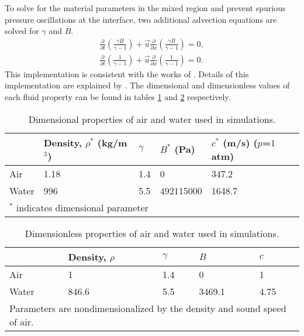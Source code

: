To solve for
the material parameters in the mixed region and prevent spurious
pressure oscillations at the interface, two additional advection
equations are solved for $\gamma$ and $B$.
\begin{subequations} \label{usbe_lung_eosvar_advection}%
\begin{align}%
\frac{\partial}{\partial t}\left(\frac{\gamma B}{\gamma-1}\right)+\vec{u}\frac{\partial}{\partial x}\left(\frac{\gamma B}{\gamma-1}\right) = 0,\\
\frac{\partial}{\partial t}\left(\frac{1}{\gamma-1}\right)+\vec{u}\frac{\partial}{\partial x}\left(\frac{1}{\gamma-1}\right) = 0. 
\end{align}%
\end{subequations}%
This implementation is consistent with the works of \cite{Abgrall1996,
  Shyue2001, Beig2015}. Details of this implementation are explained
by \cite{HenrydeFrahan2015}.
%
The dimensional and dimensionless values of each fluid property can be
found in tables \ref{tab:usbe_lung_dimensional_parameters} and
\ref{tab:usbe_lung_dimensionless_parameters} respectively.
% 
\begin{table}[bp]%
  \begin{center}
    \caption{Dimensional properties of air and water used in simulations.}
    \label{tab:usbe_lung_dimensional_parameters}%
    \begin{tabularx}{0.75\textwidth}{| X | X | X | X | X |}
      \hline
      & Density, $\rho^*$ (kg/m$^3$) & $\gamma$ & $B^*$ (Pa)  & $c^*$ (m/s) ($p$=$1$ atm) \\ \hline
      Air   & 1.18                        & 1.4      & 0         & 347.2     \\ \hline
      Water & 996                           & 5.5      & 492115000 & 1648.7     \\ \hline
      \multicolumn{5}{l}{\small $^*$ indicates dimensional parameter}
    \end{tabularx}
  \end{center}
\end{table}%
\begin{table}[bp]%
  \begin{center}
    \caption{Dimensionless properties of air and water used in simulations.}
    \label{tab:usbe_lung_dimensionless_parameters}%
    \begin{tabularx}{0.75\textwidth}{| X | X | X | X | X |}
      \hline
      & Density, $\rho$ & $\gamma$ & $B$ & $c$ \\ \hline
      Air   & 1                          & 1.4      & 0         & 1          \\ \hline
      Water & 846.6                      & 5.5      & 3469.1    & 4.75       \\ \hline
      \multicolumn{5}{l}{\small Parameters are nondimensionalized by the density and sound speed of air. }
    \end{tabularx}
  \end{center}
\end{table}
%
